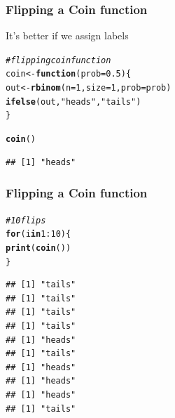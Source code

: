 \documentclass[12pt]{beamer}\usepackage[]{graphicx}\usepackage[]{color}
\makeatletter
\newcommand{\hlnum}[1]{\textcolor[rgb]{0.686,0.059,0.569}{#1}}%
\newcommand{\hlstr}[1]{\textcolor[rgb]{0.192,0.494,0.8}{#1}}%
\newcommand{\hlcom}[1]{\textcolor[rgb]{0.678,0.584,0.686}{\textit{#1}}}%
\newcommand{\hlopt}[1]{\textcolor[rgb]{0,0,0}{#1}}%
\newcommand{\hlstd}[1]{\textcolor[rgb]{0.345,0.345,0.345}{#1}}%
\newcommand{\hlkwa}[1]{\textcolor[rgb]{0.161,0.373,0.58}{\textbf{#1}}}%
\newcommand{\hlkwb}[1]{\textcolor[rgb]{0.69,0.353,0.396}{#1}}%
\newcommand{\hlkwc}[1]{\textcolor[rgb]{0.333,0.667,0.333}{#1}}%
\newcommand{\hlkwd}[1]{\textcolor[rgb]{0.737,0.353,0.396}{\textbf{#1}}}%
\newenvironment{kframe}{%
 \def\at@end@of@kframe{}%
 \ifinner\ifhmode%
  \def\at@end@of@kframe{\end{minipage}}%
  \begin{minipage}{\columnwidth}%
 \fi\fi%
 \def\FrameCommand##1{\hskip\@totalleftmargin \hskip-\fboxsep
 \colorbox{shadecolor}{##1}\hskip-\fboxsep
     \hskip-\linewidth \hskip-\@totalleftmargin \hskip\columnwidth}%
 \MakeFramed {\advance\hsize-\width
   \@totalleftmargin\z@ \linewidth\hsize
   \@setminipage}}%
 {\par\unskip\endMakeFramed%
 \at@end@of@kframe}
\newenvironment{knitrout}{}{} %
\makeatother
\begin{document}

\begin{frame}[fragile]
\frametitle{Flipping a Coin function}

It's better if we assign labels
\begin{knitrout}\footnotesize
{}\color{fgcolor}\begin{kframe}
\begin{alltt}
\hlcom{# flipping coin function}
\hlstd{coin} \hlkwb{<-} \hlkwa{function}\hlstd{(}\hlkwc{prob} \hlstd{=} \hlnum{0.5}\hlstd{) \{}
  \hlstd{out} \hlkwb{<-} \hlkwd{rbinom}\hlstd{(}\hlkwc{n} \hlstd{=} \hlnum{1}\hlstd{,} \hlkwc{size} \hlstd{=} \hlnum{1}\hlstd{,} \hlkwc{prob} \hlstd{= prob)}
  \hlkwd{ifelse}\hlstd{(out,} \hlstr{"heads"}\hlstd{,} \hlstr{"tails"}\hlstd{)}
\hlstd{\}}

\hlkwd{coin}\hlstd{()}
\end{alltt}
\begin{verbatim}
## [1] "heads"
\end{verbatim}
\end{kframe}
\end{knitrout}

\end{frame}


\begin{frame}[fragile]
\frametitle{Flipping a Coin function}

\begin{knitrout}\footnotesize
{}\color{fgcolor}\begin{kframe}
\begin{alltt}
\hlcom{# 10 flips}
\hlkwa{for} \hlstd{(i} \hlkwa{in} \hlnum{1}\hlopt{:}\hlnum{10}\hlstd{) \{}
  \hlkwd{print}\hlstd{(}\hlkwd{coin}\hlstd{())}
\hlstd{\}}
\end{alltt}
\begin{verbatim}
## [1] "tails"
## [1] "tails"
## [1] "tails"
## [1] "tails"
## [1] "heads"
## [1] "tails"
## [1] "heads"
## [1] "heads"
## [1] "heads"
## [1] "tails"
\end{verbatim}
\end{kframe}
\end{knitrout}

\end{frame}

\end{document}
